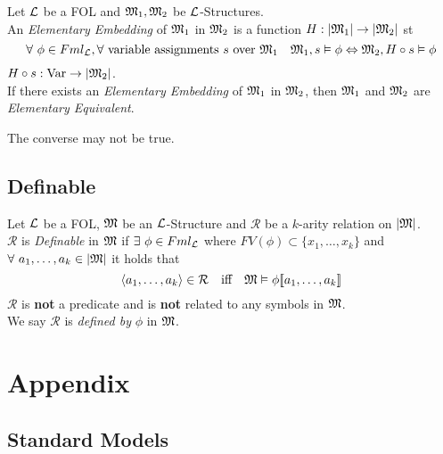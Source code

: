 \documentclass[11pt,a4paper]{article}
\begin{document}

Let $\mathcal{L}$ be a FOL and $\mathfrak{M}_1,\mathfrak{M}_2$ be $\mathcal{L}$-Structures.\\
An \textit{Elementary Embedding} of $\mathfrak{M}_1$ in $\mathfrak{M}_2$ is a function $H:|\mathfrak{M}_1|\to|\mathfrak{M}_2|$ st
$$\forall\ \phi\in Fml_{\mathcal{L}},\forall\ \text{variable assignments }s\text{ over }\mathfrak{M}_1\quad \mathfrak{M}_1,s\vDash\phi\Leftrightarrow\mathfrak{M}_2,H\circ s\vDash\phi$$
\nb $H\circ s:\mathrm{Var}\to|\mathfrak{M}_2|$.\\
\nb If there exists an \textit{Elementary Embedding} of $\mathfrak{M}_1$ in $\mathfrak{M}_2$, then $\mathfrak{M}_1$ and $\mathfrak{M}_2$ are \textit{Elementary Equivalent}.\\


\nb The converse may not be true.

\subsection{Definable}

Let $\mathcal{L}$ be a FOL, $\mathfrak{M}$ be an $\mathcal{L}$-Structure and $\mathcal{R}$ be a $k$-arity relation on $|\mathfrak{M}|$.\\
$\mathcal{R}$ is \textit{Definable} in $\mathfrak{M}$ if $\exists\ \phi\in Fml_{\mathcal{L}}$ where $FV(\phi)\subset\{x_1,\dots,x_k\}$ and $\forall\ a_1,\dots,a_k\in|\mathfrak{M}|$ it holds that
$$\langle a_1,\dots,a_k\rangle\in\mathcal{R}\quad\text{iff}\quad\mathfrak{M}\vDash\phi[\![a_1,\dots,a_k]\!]$$
\nb $\mathcal{R}$ is \textbf{not} a predicate and is \textbf{not} related to any symbols in $\mathfrak{M}$.\\
\nb We say $\mathcal{R}$ is \textit{defined by} $\phi$ in $\mathfrak{M}$.\\



\newpage\setcounter{section}{-1}
\section{Appendix}

\subsection{Standard Models}
\end{document}
